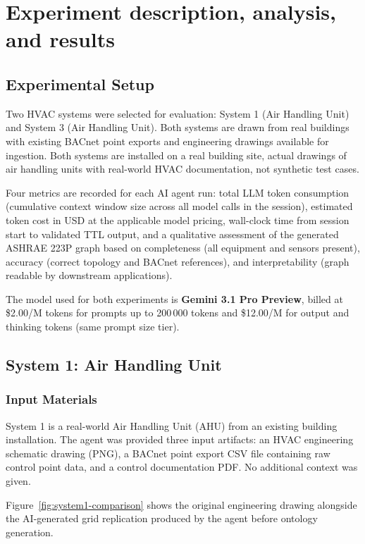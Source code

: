 \section{Experiment description, analysis, and results}
\label{sec:results}

\subsection{Experimental Setup}

Two HVAC systems were selected for evaluation: System 1 (Air Handling Unit) and System 3
(Air Handling Unit). Both systems are drawn from real buildings with existing BACnet point
exports and engineering drawings available for ingestion. Both systems are installed on a real building site,
actual drawings of air handling units with real-world HVAC documentation, not synthetic test cases.

Four metrics are recorded for each AI agent run: total LLM token consumption (cumulative
context window size across all model calls in the session), estimated token cost in USD at
the applicable model pricing, wall-clock time from session start to validated TTL output,
and a qualitative assessment of the generated ASHRAE 223P graph based on completeness
(all equipment and sensors present), accuracy (correct topology and BACnet references),
and interpretability (graph readable by downstream applications).

The model used for both experiments is \textbf{Gemini 3.1 Pro Preview}, billed at
\$2.00/M tokens for prompts up to 200\,000 tokens and \$12.00/M for output and thinking
tokens (same prompt size tier).

\subsection{System 1: Air Handling Unit}

\subsubsection{Input Materials}

System 1 is a real-world Air Handling Unit (AHU) from an existing building installation.
The agent was provided three input artifacts: an HVAC engineering schematic drawing (PNG),
a BACnet point export CSV file containing raw control point data, and a control
documentation PDF. No additional context was given.

Figure~\ref{fig:system1-comparison} shows the original engineering drawing alongside the
AI-generated grid replication produced by the agent before ontology generation.

